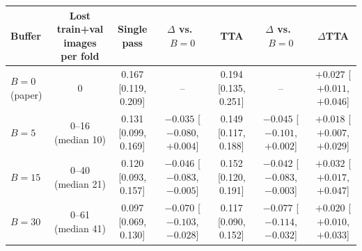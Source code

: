\begin{tabular}{@{} l c c c c c c @{}}
\toprule
\textbf{Buffer} & \textbf{Lost train+val images per fold} & \textbf{Single pass} & $\Delta$\textbf{ vs.\ $B=0$} & \textbf{TTA} & $\Delta$\textbf{ vs.\ $B=0$} & $\Delta$\textbf{TTA} \\
\midrule
$B=0$ (paper) & 0 & 0.167 [0.119, 0.209] & -- & 0.194 [0.135, 0.251] & -- & $+0.027$ [$+0.011$, $+0.046$] \\
$B=5$ & 0--16 (median 10) & 0.131 [0.099, 0.169] & $-0.035$ [$-0.080$, $+0.004$] & 0.149 [0.117, 0.188] & $-0.045$ [$-0.101$, $+0.002$] & $+0.018$ [$+0.007$, $+0.029$] \\
$B=15$ & 0--40 (median 21) & 0.120 [0.093, 0.157] & $-0.046$ [$-0.083$, $-0.005$] & 0.152 [0.120, 0.191] & $-0.042$ [$-0.083$, $-0.003$] & $+0.032$ [$+0.017$, $+0.047$] \\
$B=30$ & 0--61 (median 41) & 0.097 [0.069, 0.130] & $-0.070$ [$-0.103$, $-0.028$] & 0.117 [0.090, 0.152] & $-0.077$ [$-0.114$, $-0.032$] & $+0.020$ [$+0.010$, $+0.033$] \\
\bottomrule
\end{tabular}
